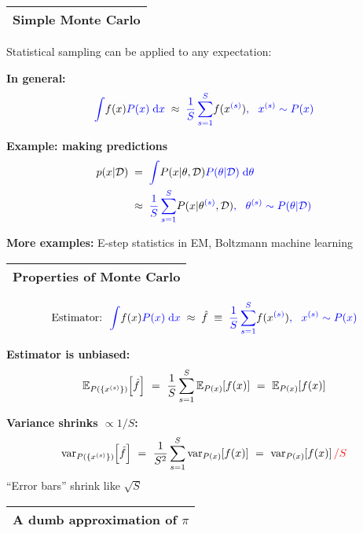 \documentclass[25pt,landscape]{foils}
\newcommand{\Red}{\textcolor{red}}
\newcommand{\Blue}{\textcolor{blue}}
\newcommand{\Gray}{\textcolor{mygray}}
\newcommand{\Green}{\textcolor{mypine}}
\newcommand{\myfoilhead}[1]{
\newpage
\vspace*{-1cm}
\Gray{
\begin{tabular*}{\textwidth}{l}
{\bf \Huge #1} \\
\bottomrule
\end{tabular*}}}
\newcommand{\ave}[2]{{\mathbb E}_{#1}\kern-2pt\left[ #2 \right]}
\newcommand{\var}[2]{{\mathrm{var}}_{#1}\kern-2pt\left[ #2 \right]}
\newcommand{\D}{\mathcal{D}}
\begin{document}
\myfoilhead{Simple Monte Carlo}

\vfill

Statistical sampling can be applied to any expectation:

\vfill

\Green{\bf In general:}\\[-0.2in]
\[
\Blue{\int} f(x) \Blue{P(x) \;\mathrm{d}x} \;\approx\; \Blue{\frac{1}{S} \sum_{s=1}^{S}} f(x^{\Blue{(s)}})\Blue{,~~
x^{(s)}\sim P(x)}
\]

\vfill

\Green{\bf Example: making predictions}\\[-0.2in]
\[
\begin{split}
p(x|\D)&\;=\;\Blue{\int} P(x|\theta,\D) \Blue{P(\theta|\D) \;\mathrm{d}\theta} \\
&\;\approx\; \Blue{\frac{1}{S} \sum_{s=1}^{S}} P(x|\theta^{\Blue{(s)}},\D)\Blue{,~~
\theta^{(s)}\sim P(\theta|\D)}
\end{split}
\]

\vfill

\textbf{More examples:} E-step statistics in EM, Boltzmann machine learning

\myfoilhead{Properties of Monte Carlo}

\vspace*{1cm}

\[
\mbox{Estimator:~~}\Blue{\int} f(x) \Blue{P(x) \;\mathrm{d}x} \;\approx\; \hat{f} \;\equiv\; \Blue{\frac{1}{S} \sum_{s=1}^{S}} f(x^{\Blue{(s)}})\Blue{,~~
x^{(s)}\sim P(x)}
\]

\vfill

\Green{\bf Estimator is unbiased:}\\[-0.3in]
\[
\ave{P(\{x^{(s)}\})}{\hat{f}} ~=~ \frac{1}{S} \sum_{s=1}^{S} \ave{P(x)}{f(x)} ~=~ \ave{P(x)}{f(x)}
\]

\vfill

\Green{\bf Variance shrinks $\propto 1/S$:}\\[-0.3in]
\[
\var{P(\{x^{(s)}\})}{\hat{f}} ~=~ \frac{1}{S^2} \sum_{s=1}^{S} \var{P(x)}{f(x)} ~=~ \var{P(x)}{f(x)} \Red{/ S}\\[0.1in]
\]
``Error bars'' shrink like $\sqrt{S}$

\myfoilhead{A dumb approximation of $\pi$}
\end{document}

